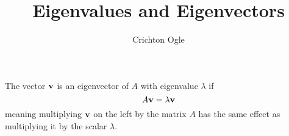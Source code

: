 \documentclass{ximera}
\title{Eigenvalues and Eigenvectors}
\author{Crichton Ogle}
\begin{document}
\begin{abstract}
\end{abstract}
\maketitle

The vector $\bf v$ is an eigenvector of $A$ with eigenvalue $\lambda$ if
\[
A{\bf v} = \lambda{\bf v}
\]
meaning multiplying $\bf v$ on the left by the matrix $A$ has the same effect as multiplying it by the scalar $\lambda$.
\end{document}
